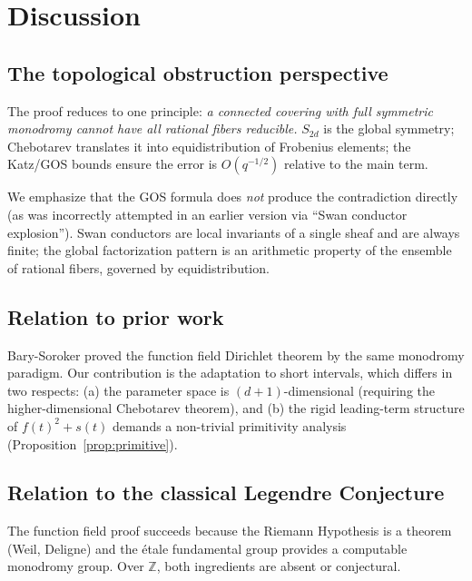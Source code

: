 \documentclass[11pt, a4paper]{article}
\theoremstyle{definition}
\theoremstyle{remark}
\begin{document}
\section{Discussion}\label{sec:discussion}

\subsection{The topological obstruction perspective}

The proof reduces to one principle:
\emph{a connected covering with full symmetric monodromy cannot
have all rational fibers reducible.}
$S_{2d}$ is the global symmetry; Chebotarev translates it into
equidistribution of Frobenius elements; the Katz/GOS bounds ensure
the error is $O(q^{-1/2})$ relative to the main term.

We emphasize that the GOS formula does \emph{not} produce
the contradiction directly (as was incorrectly attempted in
an earlier version via ``Swan conductor explosion'').
Swan conductors are local invariants of a single sheaf
and are always finite; the global factorization pattern is
an arithmetic property of the ensemble of rational fibers,
governed by equidistribution.

\subsection{Relation to prior work}

Bary-Soroker \cite{barysoroker2012} proved the function field
Dirichlet theorem by the same monodromy paradigm.
Our contribution is the adaptation to short intervals,
which differs in two respects:
(a) the parameter space is $(d+1)$-dimensional
(requiring the higher-dimensional Chebotarev theorem), and
(b) the rigid leading-term structure of $f(t)^2 + s(t)$
demands a non-trivial primitivity analysis
(Proposition~\ref{prop:primitive}).

\subsection{Relation to the classical Legendre Conjecture}

The function field proof succeeds because the Riemann Hypothesis
is a theorem (Weil, Deligne) and the \'etale fundamental group
provides a computable monodromy group.
Over $\mathbb{Z}$, both ingredients are absent or conjectural.
\end{document}
